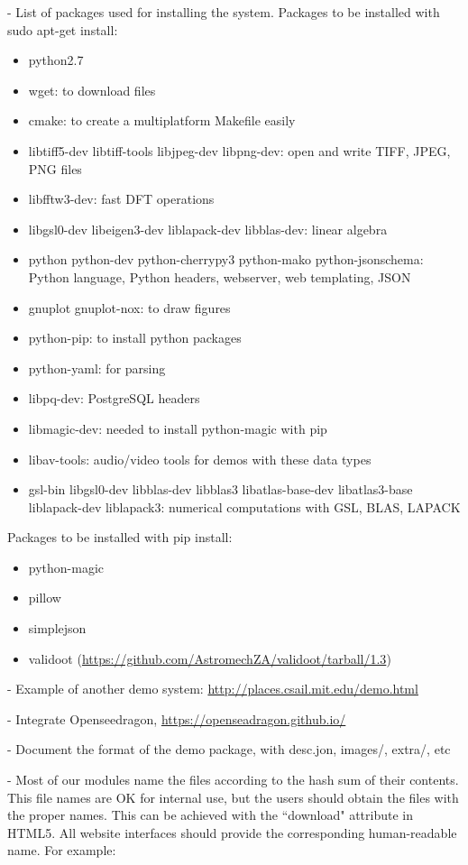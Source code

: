 \documentclass[a4paper,12pt]{article}
\begin{document}
- List of packages used for installing the system. Packages to be installed with sudo apt-get install:

\begin{itemize}
\item python2.7
\item wget: to download files
\item cmake: to create a multiplatform Makefile easily
\item libtiff5-dev libtiff-tools libjpeg-dev libpng-dev: open and write TIFF, JPEG, PNG files
\item libfftw3-dev: fast DFT operations
\item libgsl0-dev libeigen3-dev liblapack-dev libblas-dev: linear algebra
\item python python-dev python-cherrypy3 python-mako python-jsonschema: Python language, Python headers, webserver, web templating, JSON
\item gnuplot gnuplot-nox: to draw figures
\item python-pip: to install python packages
\item python-yaml: for parsing
\item libpq-dev: PostgreSQL headers
\item libmagic-dev: needed to install python-magic with pip
\item libav-tools: audio/video tools for demos with these data types
\item gsl-bin libgsl0-dev  libblas-dev libblas3 libatlas-base-dev libatlas3-base liblapack-dev liblapack3: numerical computations with GSL, BLAS, LAPACK
\end{itemize}

Packages to be installed with pip install:
\begin{itemize}
\item python-magic
\item pillow
\item simplejson
\item validoot (\url{https://github.com/AstromechZA/validoot/tarball/1.3})
\end{itemize}

- Example of another demo system: \url{http://places.csail.mit.edu/demo.html}

- Integrate Openseedragon, \url{https://openseadragon.github.io/}

- Document the format of the demo package, with desc.jon, images/, extra/, etc

- Most of our modules name the files according to the hash sum of their contents. This file names are OK for internal use, but the users should obtain the files with the proper names. This can be achieved with the ``download" attribute in HTML5. All website interfaces should provide the corresponding human-readable name. For example:
\end{document}

